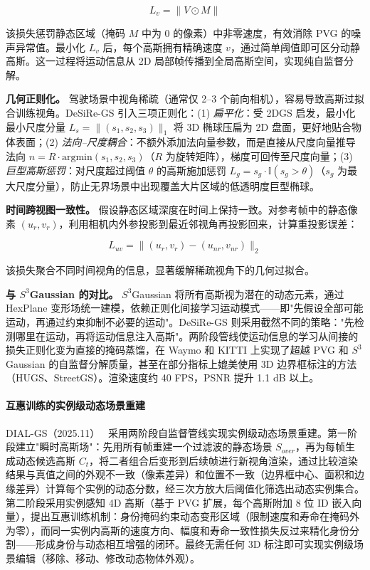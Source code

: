 \begin{equation}
L_v = \|V \odot M\|
\end{equation}

该损失惩罚静态区域（掩码 $M$ 中为 0 的像素）中非零速度，有效消除 PVG 的噪声异常值。最小化 $L_v$ 后，每个高斯拥有精确速度 $v$，通过简单阈值即可区分动静高斯。这一过程将运动信息从 2D 局部帧传播到全局高斯空间，实现纯自监督分解。

\textbf{几何正则化。} 驾驶场景中视角稀疏（通常仅 2--3 个前向相机），容易导致高斯过拟合训练视角。DeSiRe-GS 引入三项正则化：(1) \emph{扁平化}：受 2DGS 启发，最小化最小尺度分量 $L_s = \|(s_1, s_2, s_3)\|_1$ 将 3D 椭球压扁为 2D 盘面，更好地贴合物体表面；(2) \emph{法向--尺度耦合}：不额外添加法向量参数，而是直接从尺度向量推导法向 $n = R \cdot \text{argmin}(s_1, s_2, s_3)$（$R$ 为旋转矩阵），梯度可回传至尺度向量；(3) \emph{巨型高斯惩罚}：对尺度超过阈值 $\theta$ 的高斯施加惩罚 $L_g = s_g \cdot \mathbb{I}(s_g > \theta)$（$s_g$ 为最大尺度分量），防止无界场景中出现覆盖大片区域的低透明度巨型椭球。

\textbf{时间跨视图一致性。} 假设静态区域深度在时间上保持一致。对参考帧中的静态像素 $(u_r, v_r)$，利用相机内外参投影到最近邻视角再投影回来，计算重投影误差：

\begin{equation}
L_{uv} = \|(u_r, v_r) - (u_{nr}, v_{nr})\|_2
\end{equation}

该损失聚合不同时间视角的信息，显著缓解稀疏视角下的几何过拟合。

\textbf{与 $S^3$Gaussian 的对比。} $S^3$Gaussian 将所有高斯视为潜在的动态元素，通过 HexPlane 变形场统一建模，依赖正则化间接学习运动模式——即"先假设全部可能运动，再通过约束抑制不必要的运动"。DeSiRe-GS 则采用截然不同的策略："先检测哪里在运动，再将运动信息注入高斯"。两阶段管线使运动信息的学习从间接的损失正则化变为直接的掩码蒸馏，在 Waymo 和 KITTI 上实现了超越 PVG 和 $S^3$Gaussian 的自监督分解质量，甚至在部分指标上媲美使用 3D 边界框标注的方法（HUGS、StreetGS）。渲染速度约 40 FPS，PSNR 提升 1.1 dB 以上。

\paragraph{互惠训练的实例级动态场景重建}

DIAL-GS（2025.11）~\cite{2511_06632} 采用两阶段自监督管线实现实例级动态场景重建。第一阶段建立"瞬时高斯场"：先用所有帧重建一个过滤波的静态场景 $S_{over}$，再为每帧生成动态候选高斯 $C_t$，将二者组合后变形到后续帧进行新视角渲染，通过比较渲染结果与真值之间的外观不一致（像素差异）和位置不一致（边界框中心、面积和边缘差异）计算每个实例的动态分数，经三次方放大后阈值化筛选出动态实例集合。第二阶段采用实例感知 4D 高斯（基于 PVG 扩展，每个高斯附加 8 位 ID 嵌入向量），提出互惠训练机制：身份掩码约束动态变形区域（限制速度和寿命在掩码外为零），而同一实例内高斯的速度方向、幅度和寿命一致性损失反过来精化身份分割——形成身份与动态相互增强的闭环。最终无需任何 3D 标注即可实现实例级场景编辑（移除、移动、修改动态物体外观）。

